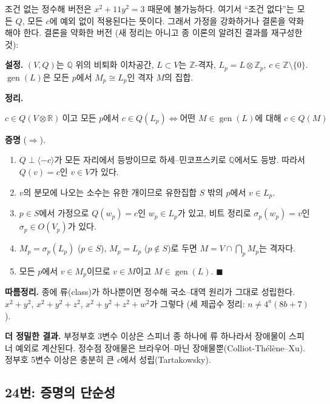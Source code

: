 조건 없는 정수해 버전은 \(x^2+11y^2=3\) 때문에 불가능하다. 여기서 ``조건
없다''는 모든 \(Q\), 모든 \(c\)에 예외 없이 적용된다는 뜻이다. 그래서
가정을 강화하거나 결론을 약화해야 한다. 결론을 약화한 버전 (새 정리는
아니고 종 이론의 알려진 결과를 재구성한 것):

\textbf{설정.} \((V,Q)\)는 \(\mathbb Q\) 위의 비퇴화 이차공간,
\(L\subset V\)는 \(\mathbb Z\)-격자, \(L_p=L\otimes\mathbb Z_p\),
\(c\in\mathbb Z\setminus\{0\}\). \(\operatorname{gen}(L)\)은 모든
\(p\)에서 \(M_p\cong L_p\)인 격자 \(M\)의 집합.

\textbf{정리.}

\[
c\in Q(V\otimes\mathbb R)\ \text{이고 모든 }p\text{에서 }c\in Q(L_p)\iff\text{어떤 }M\in\operatorname{gen}(L)\text{에 대해 }c\in Q(M)
\]

\textbf{증명} (\(\Rightarrow\)).

\begin{enumerate}
\def\labelenumi{\arabic{enumi}.}
\tightlist
\item
  \(Q\perp\langle-c\rangle\)가 모든 자리에서 등방이므로
  하세--민코프스키로 \(\mathbb Q\)에서도 등방. 따라서 \(Q(v)=c\)인
  \(v\in V\)가 있다.
\item
  \(v\)의 분모에 나오는 소수는 유한 개이므로 유한집합 \(S\) 밖의
  \(p\)에서 \(v\in L_p\).
\item
  \(p\in S\)에서 가정으로 \(Q(w_p)=c\)인 \(w_p\in L_p\)가 있고, 비트
  정리로 \(\sigma_p(w_p)=v\)인 \(\sigma_p\in O(V_p)\)가 있다.
\item
  \(M_p=\sigma_p(L_p)\) (\(p\in S\)), \(M_p=L_p\) (\(p\notin S\))로 두면
  \(M=V\cap\bigcap_pM_p\)는 격자다.
\item
  모든 \(p\)에서 \(v\in M_p\)이므로 \(v\in M\)이고
  \(M\in\operatorname{gen}(L)\). \(\blacksquare\)
\end{enumerate}

\textbf{따름정리.} 종에 류(class)가 하나뿐이면 정수해 국소--대역 원리가
그대로 성립한다. \(x^2+y^2\), \(x^2+y^2+z^2\), \(x^2+y^2+z^2+w^2\)가
그렇다 (세 제곱수 정리: \(n\ne4^a(8b+7)\)).

\textbf{더 정밀한 결과.} 부정부호 3변수 이상은 스피너 종 하나에 류
하나라서 장애물이 스피너 예외로 계산된다. 정수점 장애물은 브라우어--마닌
장애물뿐(Colliot-Thélène--Xu). 정부호 5변수 이상은 충분히 큰 \(c\)에서
성립(Tartakowsky).

\subsection{24번: 증명의 단순성}

